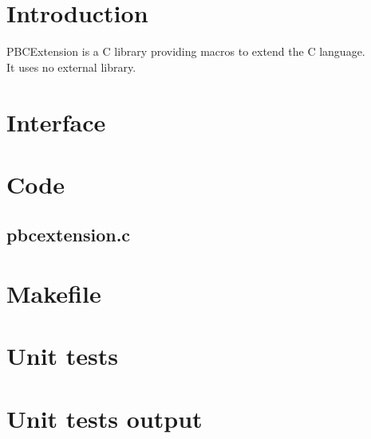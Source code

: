 \section*{Introduction}

PBCExtension is a C library providing macros to extend the C language.\\ 

It uses no external library.\\

\section{Interface}

\begin{scriptsize}
\begin{ttfamily}

\end{ttfamily}
\end{scriptsize}

\section{Code}

\subsection{pbcextension.c}

\begin{scriptsize}
\begin{ttfamily}

\end{ttfamily}
\end{scriptsize}

\section{Makefile}

\begin{scriptsize}
\begin{ttfamily}

\end{ttfamily}
\end{scriptsize}

\section{Unit tests}

\begin{scriptsize}
\begin{ttfamily}

\end{ttfamily}
\end{scriptsize}

\section{Unit tests output}

\begin{scriptsize}
\begin{ttfamily}

\end{ttfamily}
\end{scriptsize}



